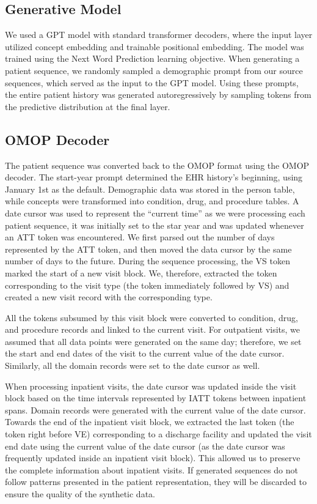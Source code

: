 \begin{multicols}{2}
\subsection{Generative Model}
We used a GPT model with standard transformer decoders, where the input layer utilized concept embedding and trainable positional embedding. The model was trained using the Next Word Prediction learning objective. When generating a patient sequence, we randomly sampled a demographic prompt from our source sequences, which served as the input to the GPT model. Using these prompts, the entire patient history was generated autoregressively by sampling tokens from the predictive distribution at the final layer. 

\subsection{OMOP Decoder}
The patient sequence was converted back to the OMOP format using the OMOP decoder. The start-year prompt determined the EHR history's beginning, using January 1st as the default. Demographic data was stored in the person table, while concepts were transformed into condition, drug, and procedure tables. A date cursor was used to represent the “current time” as we were processing each patient sequence, it was initially set to the star year and was updated whenever an ATT token was encountered. We first parsed out the number of days represented by the ATT token, and then moved the data cursor by the same number of days to the future. During the sequence processing, the VS token marked the start of a new visit block. We, therefore, extracted the token corresponding to the visit type (the token immediately followed by VS) and created a new visit record with the corresponding type. 

All the tokens subsumed by this visit block were converted to condition, drug, and procedure records and linked to the current visit. For outpatient visits, we assumed that all data points were generated on the same day; therefore, we set the start and end dates of the visit to the current value of the date cursor. Similarly, all the domain records were set to the date cursor as well. 

When processing inpatient visits, the date cursor was updated inside the visit block based on the time intervals represented by IATT tokens between inpatient spans. Domain records were generated with the current value of the date cursor. Towards the end of the inpatient visit block, we extracted the last token (the token right before VE) corresponding to a discharge facility and updated the visit end date using the current value of the date cursor (as the date cursor was frequently updated inside an inpatient visit block). This allowed us to preserve the complete information about inpatient visits. If generated sequences do not follow patterns presented in the patient representation, they will be discarded to ensure the quality of the synthetic data.


\end{multicols}
